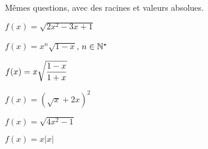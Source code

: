 \documentclass[a4paper, 11pt,reqno]{article}
\begin{document}
\begin{exercice}   \; M\^emes questions, avec des racines et valeurs absolues.\\
	\begin{enumerate}
		\begin{minipage}[t]{0.45\textwidth}
			\item $f(x)=\sqrt{2x^2-3x+1}$
			\item $f(x)=x^n\sqrt{1-x}$, $n\in\mathbb{N}^{\star}$
			\item $f(x)=x\displaystyle\sqrt{\displaystyle\frac{1-x}{1+x}}$
		\end{minipage}
		\begin{minipage}[t]{0.45\textwidth}
			\item $f(x)=(\sqrt{x}+2x)^2$
			\item $f(x)=\sqrt{4x^2-1}$
			\item $f(x)=x|x|$
		\end{minipage}
	\end{enumerate}
\end{exercice}
\end{document}
